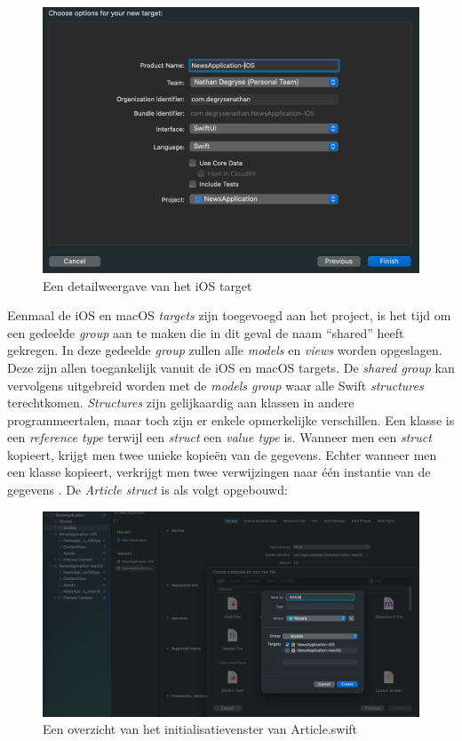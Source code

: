 \begin{figure}[!h]
    \centering
    \includegraphics[width=120mm, scale=0.7]{img/iostargetdetail.png}
    \caption{Een detailweergave van het iOS target}
\end{figure}

\newpage
Eenmaal de iOS en macOS \textit{targets} zijn toegevoegd aan het project, is het tijd om een gedeelde \textit{group} aan te maken die in dit geval de naam “shared” heeft gekregen. In deze gedeelde \textit{group} zullen alle \textit{models} en \textit{views} worden opgeslagen. Deze zijn allen toegankelijk vanuit de iOS en macOS targets. De \textit{shared group} kan vervolgens uitgebreid worden met de \textit{models group} waar alle Swift \textit{structures} terechtkomen. \textit{Structures} zijn gelijkaardig aan klassen in andere programmeertalen, maar toch zijn er enkele opmerkelijke verschillen. Een klasse is een \textit{reference type} terwijl een \textit{struct} een \textit{value type} is. Wanneer men een \textit{struct} kopieert, krijgt men twee unieke kopieën van de gegevens. Echter wanneer men een klasse kopieert, verkrijgt men twee verwijzingen naar één instantie van de gegevens \autocite{Khan2021}. De \textit{Article struct} is als volgt opgebouwd: 

\begin{figure}[!h]
    \centering
    \includegraphics[width=120mm, scale=0.7]{img/articleswift.png}
    \caption{Een overzicht van het initialisatievenster van Article.swift}
\end{figure}

